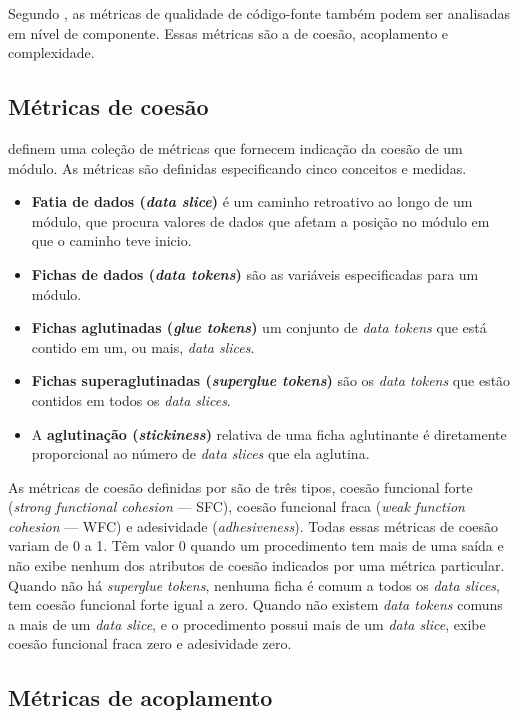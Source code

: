 Segundo , as métricas de qualidade de código-fonte também podem ser analisadas em nível de componente. Essas métricas são a de coesão, acoplamento e complexidade.

\subsection{Métricas de coesão}

 definem uma coleção de métricas que fornecem indicação da coesão de um módulo. As métricas são definidas especificando cinco conceitos e medidas.

\begin{itemize}
	\item\textbf{Fatia de dados (\textit{data slice})} é um caminho retroativo ao longo de um módulo, que procura valores de dados que afetam a posição no módulo em que o caminho teve inicio.
	\item\textbf{Fichas de dados (\textit{data tokens})} são as variáveis especificadas para um módulo.
	\item\textbf{Fichas aglutinadas (\textit{glue tokens})} um conjunto de \textit{data tokens} que está contido em um, ou mais, \textit{data slices}.
	\item\textbf{Fichas superaglutinadas (\textit{superglue tokens})} são os \textit{data tokens} que estão contidos em todos os \textit{data slices}.
	\item A \textbf{aglutinação (\textit{stickiness})} relativa de uma ficha aglutinante é diretamente proporcional ao número de \textit{data slices} que ela aglutina.
\end{itemize}

As métricas de coesão definidas por  são de três tipos, coesão funcional forte (\textit{strong functional cohesion} --- SFC), coesão funcional fraca (\textit{weak function cohesion} --- WFC) e adesividade (\textit{adhesiveness}). 
Todas essas métricas de coesão variam de 0 a 1. Têm valor 0 quando um procedimento tem mais de uma saída e não exibe nenhum dos atributos de coesão indicados por uma métrica particular. Quando não há \textit{superglue tokens}, nenhuma ficha é comum a todos os \textit{data slices}, tem coesão funcional forte igual a zero. Quando não existem \textit{data tokens} comuns a mais de um \textit{data slice}, e o procedimento possui mais de um \textit{data slice}, exibe coesão funcional fraca zero e adesividade zero.

\subsection{Métricas de acoplamento}

